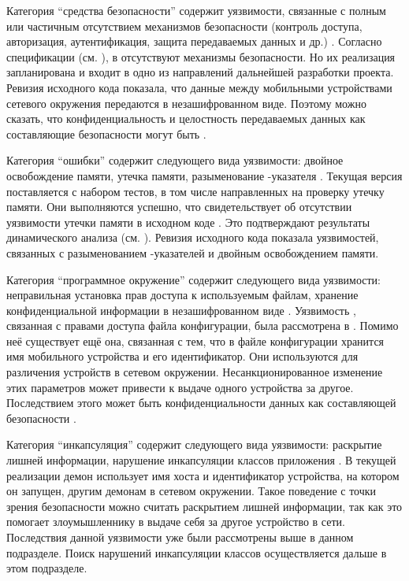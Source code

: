 %
Категория ``средства безопасности'' содержит уязвимости, связанные с полным или частичным отсутствием механизмов безопасности (контроль доступа, авторизация, аутентификация, защита передаваемых данных и др.) . 
%
Согласно спецификации (см. ), в  отсутствуют механизмы безопасности. 
%
Но их реализация запланирована и входит в одно из направлений дальнейшей разработки проекта. 
%
Ревизия исходного кода показала, что данные между мобильными устройствами сетевого окружения передаются в незашифрованном виде. 
%
Поэтому можно сказать, что конфиденциальность и целостность передаваемых данных как составляющие безопасности  могут быть . 

%
Категория ``ошибки'' содержит следующего вида уязвимости: двойное освобождение памяти, утечка памяти, разыменование -указателя . 
%
Текущая версия  поставляется с набором тестов, в том числе направленных на проверку утечку памяти. 
%
Они выполняются успешно, что свидетельствует об отсутствии уязвимости утечки памяти в исходном коде . 
%
Это подтверждают результаты динамического анализа (см. ). 
%
Ревизия исходного кода показала  уязвимостей, связанных с разыменованием -указателей и двойным освобождением памяти. 

%
Категория ``программное окружение'' содержит следующего вида уязвимости: неправильная установка прав доступа к используемым файлам, хранение конфиденциальной информации в незашифрованном виде . 
%
Уязвимость , связанная с правами доступа файла конфигурации, была рассмотрена в . 
%
Помимо неё существует ещё она, связанная с тем, что в файле конфигурации хранится имя мобильного устройства и его идентификатор. 
%
Они используются для различения устройств в сетевом окружении. 
%
Несанкционированное изменение этих параметров может привести к выдаче одного устройства за другое. 
%
Последствием этого может быть  конфиденциальности данных как составляющей безопасности . 

%
Категория ``инкапсуляция'' содержит следующего вида уязвимости: раскрытие лишней информации, нарушение инкапсуляции классов приложения . 
%
В текущей реализации  демон использует имя хоста и идентификатор устройства, на котором он запущен, другим демонам в сетевом окружении. 
%
Такое поведение с точки зрения безопасности можно считать раскрытием лишней информации, так как это помогает злоумышленнику в выдаче себя за другое устройство в сети. 
%
Последствия данной уязвимости уже были рассмотрены выше в данном подразделе.
%
Поиск нарушений инкапсуляции классов   осуществляется дальше в этом подразделе. 

